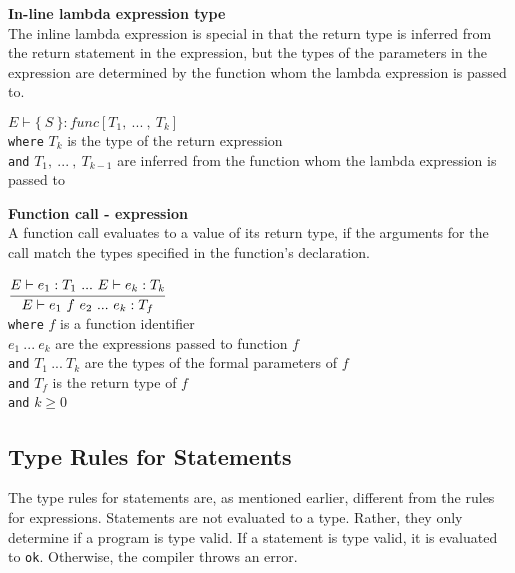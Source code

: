 \textbf{In-line lambda expression type}\\
The inline lambda expression is special in that the return type is inferred from the return statement in the expression, but the types of the parameters in the expression are determined by the function whom the lambda expression is passed to.

\begin{center}
	\begin{math}
	E \vdash \{\ S\ \} : func[T_1,\ .
	.
	.
	\ ,\ T_k]
	\end{math}
	\\[1\baselineskip]
	\texttt{where} $T_k$ is the type of the return expression\\
	\texttt{and} $T_1, \ .
	.
	.
	\ ,\ T_{k-1}$ are inferred from the function whom the lambda expression is passed to%
\end{center}

\textbf{Function call - expression}\\
A function call evaluates to a value of its return type, if the arguments for the call match the types specified in the function's declaration.

\begin{center}
	\begin{math}
		\cfrac
		{E \vdash e_1 : T_1 \ .
		.
		.
		\ E \vdash e_k : T_k}
		{E \vdash e_1\ f\ e_2 \ .
		.
		.
		\ e_k : T_f}
	\end{math}
	\\[1\baselineskip]
	\texttt{where} $f$ is a function identifier\\
	$e_1\ .
	.
	.
	\ e_k$ are the expressions passed to function $f$\\
	\texttt{and} $T_1\ .
	.
	.
	\ T_k$ are the types of the formal parameters of $f$\\
	\texttt{and} $T_f$ is the return type of $f$\\
	\texttt{and} $k \ge 0$
\end{center}



\subsection{Type Rules for Statements}
The type rules for statements are, as mentioned earlier, different from the rules for expressions.
Statements are not evaluated to a type.
Rather, they only determine if a program is type valid.
If a statement is type valid, it is evaluated to \texttt{ok}.
Otherwise, the compiler throws an error.

